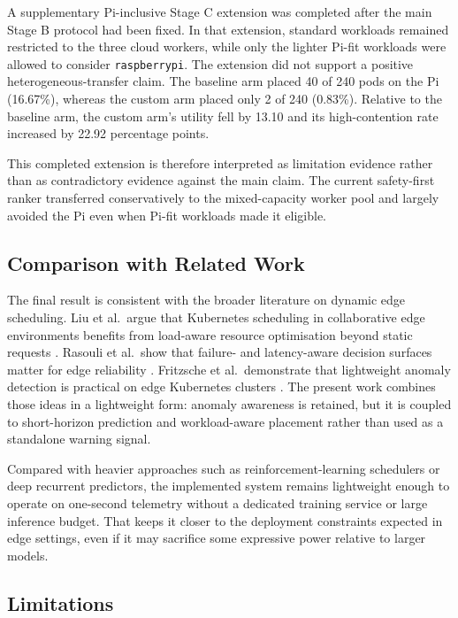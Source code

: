 A supplementary Pi-inclusive Stage C extension was completed after the main Stage B protocol had been fixed. In that extension, standard workloads remained restricted to the three cloud workers, while only the lighter Pi-fit workloads were allowed to consider \texttt{raspberrypi}. The extension did not support a positive heterogeneous-transfer claim. The baseline arm placed 40 of 240 pods on the Pi (16.67\%), whereas the custom arm placed only 2 of 240 (0.83\%). Relative to the baseline arm, the custom arm's utility fell by 13.10 and its high-contention rate increased by 22.92 percentage points.

This completed extension is therefore interpreted as limitation evidence rather than as contradictory evidence against the main claim. The current safety-first ranker transferred conservatively to the mixed-capacity worker pool and largely avoided the Pi even when Pi-fit workloads made it eligible.


\subsection{Comparison with Related Work}

The final result is consistent with the broader literature on dynamic edge scheduling. Liu et al.~argue that Kubernetes scheduling in collaborative edge environments benefits from load-aware resource optimisation beyond static requests \cite{liu2024dynamic}. Rasouli et al.~show that failure- and latency-aware decision surfaces matter for edge reliability \cite{rasouli2025false}. Fritzsche et al.~demonstrate that lightweight anomaly detection is practical on edge Kubernetes clusters \cite{fritzsche2024lightweight}. The present work combines those ideas in a lightweight form: anomaly awareness is retained, but it is coupled to short-horizon prediction and workload-aware placement rather than used as a standalone warning signal.

Compared with heavier approaches such as reinforcement-learning schedulers or deep recurrent predictors, the implemented system remains lightweight enough to operate on one-second telemetry without a dedicated training service or large inference budget. That keeps it closer to the deployment constraints expected in edge settings, even if it may sacrifice some expressive power relative to larger models.


\subsection{Limitations}
\label{sec:limitations}

